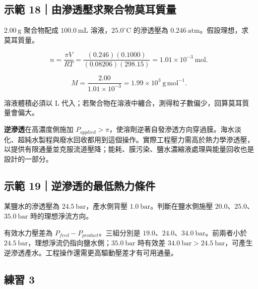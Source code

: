 \documentclass[11pt,a4paper]{article}
\begin{document}
\begin{HandoutWorkedExample}

\subsection{示範 18｜由滲透壓求聚合物莫耳質量}\label{ux793aux7bc4-18ux7531ux6ef2ux900fux58d3ux6c42ux805aux5408ux7269ux83abux8033ux8ceaux91cf}

\(2.00\ \mathrm g\) 聚合物配成 \(100.0\ \mathrm{mL}\) 溶液，\(25.0^\circ\mathrm C\) 的滲透壓為 \(0.246\ \mathrm{atm}\)。假設理想，求莫耳質量。

\[
n=\frac{\pi V}{RT}=\frac{(0.246)(0.1000)}{(0.08206)(298.15)}=1.01\times10^{-3}\ \mathrm{mol}.
\]

\[
M=\frac{2.00}{1.01\times10^{-3}}=1.99\times10^3\ \mathrm{g\,mol^{-1}}.
\]

溶液體積必須以 L 代入；若聚合物在溶液中纏合，測得粒子數偏少，回算莫耳質量會偏大。

\end{HandoutWorkedExample}

\textbf{逆滲透}在高濃度側施加 \(P_{applied}>\pi\)，使溶劑逆著自發滲透方向穿過膜。海水淡化、超純水製程與廢水回收都用到這個操作。實際工程壓力需高於熱力學滲透壓，以提供有限通量並克服流道壓降；能耗、膜污染、鹽水濃縮液處理與能量回收也是設計的一部分。

\begin{HandoutWorkedExample}

\subsection{示範 19｜逆滲透的最低熱力條件}\label{ux793aux7bc4-19ux9006ux6ef2ux900fux7684ux6700ux4f4eux71b1ux529bux689dux4ef6}

某鹽水的滲透壓為 \(24.5\ \mathrm{bar}\)，產水側背壓 \(1.0\ \mathrm{bar}\)。判斷在鹽水側施壓 \(20.0\)、\(25.0\)、\(35.0\ \mathrm{bar}\) 時的理想淨流方向。

有效水力壓差為 \(P_{feed}-P_{product}\)。三組分別是 \(19.0\)、\(24.0\)、\(34.0\ \mathrm{bar}\)。前兩者小於 \(24.5\ \mathrm{bar}\)，理想淨流仍指向鹽水側；\(35.0\ \mathrm{bar}\) 時有效差 \(34.0\ \mathrm{bar}>24.5\ \mathrm{bar}\)，可產生逆滲透產水。工程操作還需更高驅動壓差才有可用通量。

\end{HandoutWorkedExample}

\subsection{練習 3}\label{ux7df4ux7fd2-3}
\end{document}
